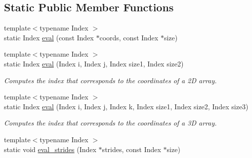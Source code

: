 \subsection*{Static Public Member Functions}
\begin{DoxyCompactItemize}
\item 
{\footnotesize template$<$typename Index $>$ }\\static Index \hyperlink{struct_d_o_1_1_offset_3_01_n_00_01_row_major_01_4_a156c0b86b1e62dfdfe3f957ef54c619c}{eval} (const Index $\ast$coords, const Index $\ast$size)
\item 
\hypertarget{struct_d_o_1_1_offset_3_01_n_00_01_row_major_01_4_affb094f082ace3f8d9949275933b888b}{{\footnotesize template$<$typename Index $>$ }\\static Index \hyperlink{struct_d_o_1_1_offset_3_01_n_00_01_row_major_01_4_affb094f082ace3f8d9949275933b888b}{eval} (Index i, Index j, Index size1, Index size2)}\label{struct_d_o_1_1_offset_3_01_n_00_01_row_major_01_4_affb094f082ace3f8d9949275933b888b}

\begin{DoxyCompactList}\small\item\em Computes the index that corresponds to the coordinates of a 2\-D array. \end{DoxyCompactList}\item 
\hypertarget{struct_d_o_1_1_offset_3_01_n_00_01_row_major_01_4_aa4c5802a75e5a07cc68e458b9242f8a2}{{\footnotesize template$<$typename Index $>$ }\\static Index \hyperlink{struct_d_o_1_1_offset_3_01_n_00_01_row_major_01_4_aa4c5802a75e5a07cc68e458b9242f8a2}{eval} (Index i, Index j, Index k, Index size1, Index size2, Index size3)}\label{struct_d_o_1_1_offset_3_01_n_00_01_row_major_01_4_aa4c5802a75e5a07cc68e458b9242f8a2}

\begin{DoxyCompactList}\small\item\em Computes the index that corresponds to the coordinates of a 3\-D array. \end{DoxyCompactList}\item 
\hypertarget{struct_d_o_1_1_offset_3_01_n_00_01_row_major_01_4_ad02911d67da0ad2bcf95bf5957f37553}{{\footnotesize template$<$typename Index $>$ }\\static void \hyperlink{struct_d_o_1_1_offset_3_01_n_00_01_row_major_01_4_ad02911d67da0ad2bcf95bf5957f37553}{eval\-\_\-strides} (Index $\ast$strides, const Index $\ast$size)}\label{struct_d_o_1_1_offset_3_01_n_00_01_row_major_01_4_ad02911d67da0ad2bcf95bf5957f37553}


\end{DoxyCompactItemize}
